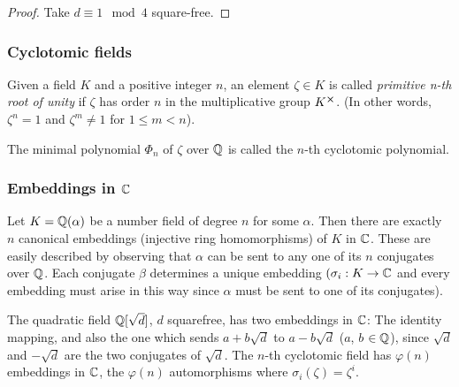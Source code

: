 \begin{proof}
	Take $d \equiv 1 \mod 4$ square-free.
\end{proof}
\subsubsection*{Cyclotomic fields}

\begin{definition}
    Given a field $K$ and a positive integer $n$, an element $\zeta \in K$ is called \textit{primitive n-th root of unity} if $\zeta$ has order $n$ in the multiplicative group $K^{\cross}$. (In other words, $\zeta^n = 1$ and $\zeta^m \neq 1$ for $1 \leq m < n$).
\end{definition}

The minimal polynomial $\Phi_n$ of $\zeta$ over $\mathbb{Q}$ is called the $n$-th cyclotomic polynomial.

\subsubsection*{Embeddings in $\mathbb{C}$}
Let $K = \mathbb{Q}(\alpha)$ be a number field of degree $n$ for some $\alpha$. Then there are exactly $n$ canonical embeddings (injective ring homomorphisms) of $K$ in $\mathbb{C}$. These are easily described by observing that $\alpha$ can be sent to any one of its $n$ conjugates over $\mathbb{Q}$. Each conjugate $\beta$ determines a unique embedding $(\sigma_i: K \rightarrow \mathbb{C}$ and every embedding must arise in this way since $\alpha$ must be sent to one of its conjugates).

\begin{example}
    The quadratic field $\mathbb{Q}[\sqrt{d}]$, $d$ squarefree, has two embeddings in $\mathbb{C}$: The identity mapping, and also the one which sends $a + b\sqrt{d}$ to $a - b\sqrt{d}$ ($a$, $b$ $\in \mathbb{Q}$), since $\sqrt{d}$ and $-\sqrt{d}$ are the two conjugates of $\sqrt{d}$. The $n$-th cyclotomic field has $\varphi(n)$ embeddings in $\mathbb{C}$, the $\varphi(n)$ automorphisms where $\sigma_i(\zeta) = \zeta^i$.
\end{example}

\iffalse
\begin{corollary}
    Let $n = 2^r$ for some $r \in \Z$. The ideals in the ring of integers of the cyclotomic field of $2n$-th roots of unity $K = \Q[2n]$ are $n$-dimensional lattices.
\end{corollary}

\begin{proof}
    Note that the ideals have degree $\varphi(2n) = \varphi(2^{r+1}) = 2^{r+1} - 2^r = 2^r = n$. The rest follows by the previous theorem.
\end{proof}
\fi

